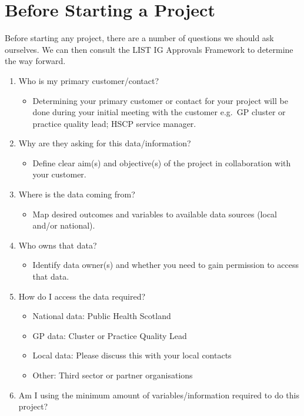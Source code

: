 \documentclass[
]{book}
\providecommand{\tightlist}{%
  \setlength{\itemsep}{0pt}\setlength{\parskip}{0pt}}
\begin{document}
\hypertarget{before-starting-a-project}{%
\section{Before Starting a Project}\label{before-starting-a-project}}

Before starting any project, there are a number of questions we should ask ourselves. We can then consult the LIST IG Approvals Framework to determine the way forward.

\begin{enumerate}
\def\labelenumi{\arabic{enumi}.}
\item
  Who is my primary customer/contact?

  \begin{itemize}
  \tightlist
  \item
    Determining your primary customer or contact for your project will be done during your initial meeting with the customer e.g.~GP cluster or practice quality lead; HSCP service manager.
  \end{itemize}
\item
  Why are they asking for this data/information?

  \begin{itemize}
  \tightlist
  \item
    Define clear aim(s) and objective(s) of the project in collaboration with your customer.
  \end{itemize}
\item
  Where is the data coming from?

  \begin{itemize}
  \tightlist
  \item
    Map desired outcomes and variables to available data sources (local and/or national).
  \end{itemize}
\item
  Who owns that data?

  \begin{itemize}
  \tightlist
  \item
    Identify data owner(s) and whether you need to gain permission to access that data.
  \end{itemize}
\item
  How do I access the data required?

  \begin{itemize}
  \tightlist
  \item
    National data: Public Health Scotland
  \item
    GP data: Cluster or Practice Quality Lead\\
  \item
    Local data: Please discuss this with your local contacts
  \item
    Other: Third sector or partner organisations
  \end{itemize}
\item
  Am I using the minimum amount of variables/information required to do this project?


\end{enumerate}
\end{document}
